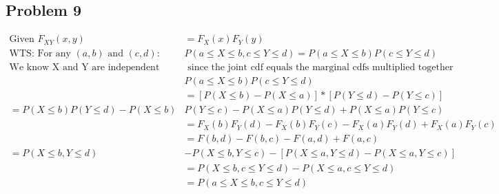\documentclass{article}
\begin{document}
\begin{flushleft}
\section*{Problem 9}
\begin{align*}
\text{Given } F_{XY}(x,y)&=F_X(x)F_Y(y)\\
\text{WTS: } \text{For any }  (a,b) \text{ and } (c,d):&
P(a\leq X \leq b, c \leq Y \leq d)=P(a\leq X \leq b) P(c \leq Y \leq d)\\
\text{We know X and Y are independent}&\text{ since the joint cdf equals the marginal cdfs multiplied together}\\
&P(a\leq X \leq b)P(c \leq Y \leq d)\\
&=[P(X\leq b)-P(X\leq a)]*[P(Y\leq d)-P(Y\leq c)]\\
=P(X\leq b)P(Y\leq d)-P(X\leq b)&P(Y\leq c)-P(X\leq a)P(Y\leq d)+P(X\leq a)P(Y\leq c)\\
&=F_X(b)F_Y(d)-F_X(b)F_Y(c)-F_X(a)F_Y(d)+F_X(a)F_Y(c)\\
&=F(b,d)-F(b,c)-F(a,d)+F(a,c)\\
=P(X\leq b, Y \leq d)&-P(X\leq b, Y\leq c)-[P(X\leq a, Y\leq d)-P(X\leq a, Y\leq c)]\\
&=P(X\leq b, c\leq Y \leq d)-P(X\leq a,c\leq Y \leq d)\\
&=P(a\leq X\leq b, c\leq Y\leq d)
\end{align*}
\end{flushleft}
\end{document}
